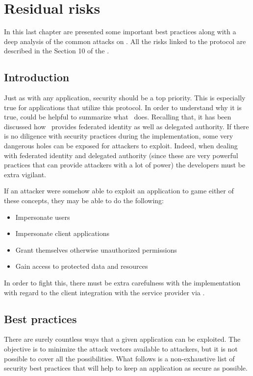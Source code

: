 \chapter{Residual risks}
In this last chapter are presented some important best practices along with a deep analysis of the common attacks on \textit{\oauth}. All the risks linked to the protocol are described in the Section 10 of the  \cite{RFC6749}.

\minitoc

\section{Introduction}
Just as with any application, security should be a top priority. This is especially true for applications that utilize this protocol. In order to understand why it is true, could be helpful to summarize what \oauth\ does. Recalling that, it has been discussed how \oauth\ provides federated identity as well as delegated authority. If there is no diligence with security practices during the implementation, some very dangerous holes can be exposed for attackers to exploit.
Indeed, when dealing with federated identity and delegated authority (since these are very powerful practices that can provide attackers with a lot of power) the developers must be extra vigilant.

If an attacker were somehow able to exploit an application to game either of these concepts, they may be able to do the following:

\begin{itemize}
    \item Impersonate users
    \item Impersonate client applications
    \item Grant themselves otherwise unauthorized permissions
    \item Gain access to protected data and resources
\end{itemize}

In order to fight this, there must be extra carefulness with the implementation with regard to the client integration with the service provider via \oauth. 

\section{Best practices}
There are surely countless ways that a given application can be exploited. The objective is to minimize the attack vectors available to attackers, but it is not possible to cover all the possibilities. What follows is a non-exhaustive list of security best practices that will help to keep an application as secure as possible. 

